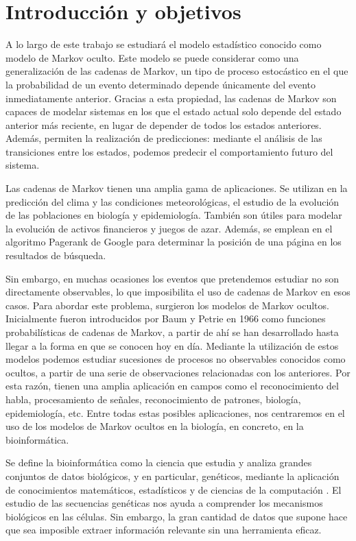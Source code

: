 \chapter*{Introducción y objetivos}

A lo largo de este trabajo se estudiará el modelo estadístico conocido como modelo de Markov oculto. Este modelo se puede considerar como una generalización de las cadenas de Markov, un tipo de proceso estocástico en el que la probabilidad de un evento determinado depende únicamente del evento inmediatamente anterior. Gracias a esta propiedad, las cadenas de Markov son capaces de modelar sistemas en los que el estado actual solo depende del estado anterior más reciente, en lugar de depender de todos los estados anteriores. Además, permiten la realización de predicciones: mediante el análisis de las transiciones entre los estados, podemos predecir el comportamiento futuro del sistema. 

Las cadenas de Markov tienen una amplia gama de aplicaciones. Se utilizan en la predicción del clima y las condiciones meteorológicas, el estudio de la evolución de las poblaciones en biología y epidemiología. También son útiles para modelar la evolución de activos financieros y juegos de azar. Además, se emplean en el algoritmo Pagerank de Google para determinar la posición de una página en los resultados de búsqueda.

Sin embargo, en muchas ocasiones los eventos que pretendemos estudiar no son directamente observables, lo que imposibilita el uso de cadenas de Markov en esos casos. Para abordar este problema, surgieron los modelos de Markov ocultos. Inicialmente fueron introducidos por Baum y Petrie en 1966 \cite{Baum} como funciones probabilísticas de cadenas de Markov, a partir de ahí se han desarrollado hasta llegar a la forma en que se conocen hoy en día. Mediante la utilización de estos modelos podemos estudiar sucesiones de procesos no observables conocidos como ocultos, a partir de una serie de observaciones relacionadas con los anteriores. Por esta razón, tienen una amplia aplicación en campos como el reconocimiento del habla, procesamiento de señales, reconocimiento de patrones, biología, epidemiología, etc. Entre todas estas posibles aplicaciones, nos centraremos en el uso de los modelos de Markov ocultos en la biología, en concreto, en la bioinformática. 

Se define la bioinformática como la ciencia que estudia y analiza grandes conjuntos de datos biológicos, y en particular, genéticos, mediante la aplicación de conocimientos matemáticos, estadísticos y de ciencias de la computación \cite{Warren}. El estudio de las secuencias genéticas nos ayuda a comprender los mecanismos biológicos en las células. Sin embargo, la gran cantidad de datos que supone hace que sea imposible extraer información relevante sin una herramienta eficaz. 

